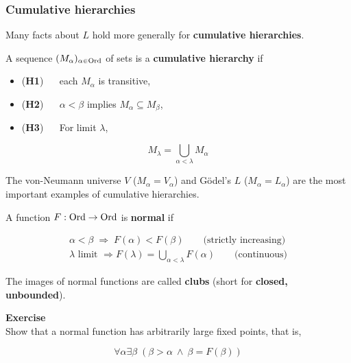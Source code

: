 \subsubsection{Cumulative hierarchies}

Many facts about $L$ hold more generally for \textbf{cumulative hierarchies}.

\begin{definition}\label{def-cumulative}A sequence $(M_\alpha)_{\alpha \in \operatorname{Ord}}$ of sets is a \textbf{cumulative hierarchy} if

\begin{itemize}
\item (\textbf{H1}) $\quad$ each $M_\alpha$ is transitive,
\item (\textbf{H2}) $\quad$ $\alpha < \beta$ implies $M_\alpha \subseteq M_\beta$,
\item (\textbf{H3}) $\quad$ For limit $\lambda$,
\end{itemize}
\begin{equation*}
M_\lambda = \bigcup_{\alpha < \lambda} M_\alpha
\end{equation*}
\end{definition}The von-Neumann universe $V$ ($M_\alpha = V_\alpha$) and Gödel's $L$ ($M_\alpha = L_\alpha$) are the most important examples of cumulative hierarchies.

\begin{definition}\label{def-normal-function}A function $F: \operatorname{Ord} \to \operatorname{Ord}$ is \textbf{normal} if

\begin{gather*}
\alpha < \beta \; \Rightarrow \; F(\alpha) < F(\beta) \qquad \text{(strictly increasing)} \\
\lambda \text{ limit } \Rightarrow F(\lambda) = \bigcup_{\alpha < \lambda} F(\alpha) \qquad \text{(continuous)}
\end{gather*}
\end{definition}The images of normal functions are called \textbf{clubs} (short for \textbf{closed, unbounded}).

\begin{framed}
\textbf{Exercise}\\
Show that a normal function has arbitrarily large fixed points, that is,

\begin{equation}
\forall \alpha \exists \beta \; (\beta > \alpha \: \wedge \: \beta = F(\beta))
\end{equation}
\end{framed}

